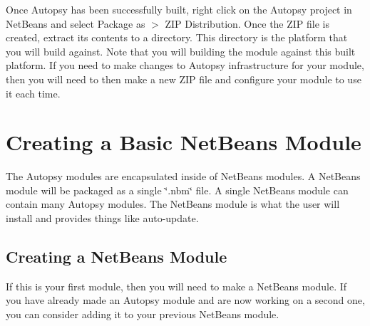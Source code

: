 Once Autopsy has been successfully built, right click on the Autopsy project in Net\+Beans and select Package as $>$ Z\+IP Distribution. Once the Z\+IP file is created, extract its contents to a directory. This directory is the platform that you will build against. Note that you will building the module against this built platform. If you need to make changes to Autopsy infrastructure for your module, then you will need to then make a new Z\+IP file and configure your module to use it each time.\hypertarget{mod_dev_page_mod_dev_module}{}\section{Creating a Basic Net\+Beans Module}\label{mod_dev_page_mod_dev_module}
The Autopsy modules are encapsulated inside of Net\+Beans modules. A Net\+Beans module will be packaged as a single \char`\"{}.\+nbm\char`\"{} file. A single Net\+Beans module can contain many Autopsy modules. The Net\+Beans module is what the user will install and provides things like auto-\/update.\hypertarget{mod_dev_page_mod_dev_mod_nb}{}\subsection{Creating a Net\+Beans Module}\label{mod_dev_page_mod_dev_mod_nb}
If this is your first module, then you will need to make a Net\+Beans module. If you have already made an Autopsy module and are now working on a second one, you can consider adding it to your previous Net\+Beans module.

